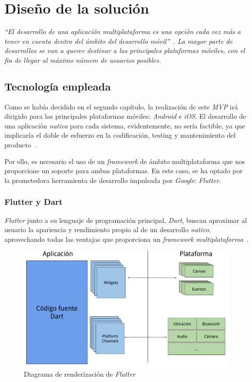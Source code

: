 \chapter{Diseño de la solución}
\textit{``El desarrollo de una aplicación multiplataforma es una opción cada vez más a tener en 
cuenta dentro del ámbito del desarrollo móvil''~\cite{10.1145/3241739}. La mayor parte de desarrollos
se van a querer destinar a las principales plataformas móviles, 
con el fin de llegar al máximo número de usuarios posibles.
}

\section{Tecnología empleada}
Como se había decidido en el segundo capítulo, la realización de este \textit{MVP} irá dirigido para las
principales plataformas móviles: \textit{Android} e \textit{iOS}. El desarrollo de una aplicación \textit{nativa} para 
cada sistema, evidentemente, no sería factible, ya que implicaría el doble de esfuerzo en la codificación,
testing y mantenimiento del producto~\cite{10.1145/2480362.2480464}.

Por ello, es necesario el uso de un \textit{framework} de ámbito multiplataforma que nos proporcione un
soporte para ambas plataformas. En este caso, se ha optado por la prometedora herramienta de desarrollo
impulsada por \textit{Google}: \textit{Flutter}.

\subsection{Flutter y Dart}
\textit{Flutter} junto a su lenguaje de programación principal, \textit{Dart}, buscan 
aproximar al usuario la apariencia y rendimiento 
propio al de un desarrollo \textit{nativo}, aprovechando todas las ventajas que proporciona 
un \textit{framework multiplataforma}~\cite{7934674}.

\begin{figure}[H]
    \centering
    \includegraphics[scale=0.45]{images/flutter1.pdf}
    \caption{Diagrama de renderización de \textit{Flutter}\cite{leler2019s}}
    \label{fig:flutter1}
  \end{figure}

